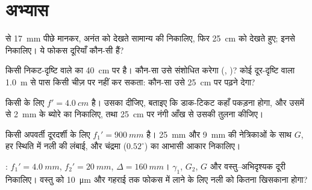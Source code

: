 \section{अभ्यास}

\begin{exercise}[$\star$]\label{exo:b1:optical-instruments:1}
  से \qty{17}{mm} पीछे मानकर, अनंत को देखते सामान्य  की
 निकालिए, फिर \qty{25}{cm} को देखते हुए; इनसे 
निकालिए। ये फोकस दूरियाँ कौन-सी हैं?
\end{exercise}

\begin{exercise}[$\star$]\label{exo:b1:optical-instruments:2}
किसी निकट-दृष्टि वाले  का  \qty{40}{cm} पर है। कौन-सा  उसे
संशोधित करेगा (, )? कोई दूर-दृष्टि वाला  \qty{1.0}{m}
से पास किसी चीज़ पर  नहीं कर सकता: कौन-सा  उसे \qty{25}{cm} पर पढ़ने
देगा?
\end{exercise}

\begin{exercise}[$\star$]\label{exo:b1:optical-instruments:3}
किसी  के लिए $f' = \qty{4.0}{cm}$ है। उसका  दीजिए, बताइए
कि डाक-टिकट कहाँ पकड़ना होगा, और उसमें से \qty{2}{mm} के ब्योरे का 
निकालिए, तथा \qty{25}{cm} पर नंगी आँख से उसकी तुलना कीजिए।
\end{exercise}

\begin{exercise}[$\star$]\label{exo:b1:optical-instruments:4}
किसी अपवर्ती दूरदर्शी के लिए $f_1' = \qty{900}{mm}$ है। \qty{25}{mm} और
\qty{9}{mm} की नेत्रिकाओं के साथ $G$, हर स्थिति में नली की लंबाई, और चंद्रमा
($0.52^\circ$) का आभासी आकार निकालिए।
\end{exercise}

\begin{exercise}[$\star\star$]\label{exo:b1:optical-instruments:5}
: $f_1' = \qty{4.0}{mm}$, $f_2' = \qty{20}{mm}$,
$\Delta = \qty{160}{mm}$। $\gamma_1$, $G_2$, $G$ और वस्तु--अभिदृश्यक दूरी
निकालिए। वस्तु को \qty{10}{\micro m} और गहराई तक फोकस में लाने के लिए नली को
कितना खिसकाना होगा?
\end{exercise}

